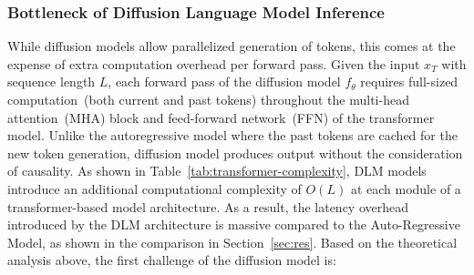 
\begin{table}[h!]
\centering
\renewcommand{\arraystretch}{1.1}
\vspace{1.0em}
\caption{Compute complexity of Transformer modules: AR decodes a prefix of length \(l\) per token vs. DLM processes full length \(L\) each denoising step.}
\label{tab:transformer-complexity}
\end{table}

\subsubsection{Bottleneck of Diffusion Language Model Inference}

While diffusion models allow parallelized generation of tokens, this comes at the expense of extra computation overhead per forward pass. 
Given the input $x_T$ with sequence length $L$, each forward pass of the diffusion model $f_\theta$ requires full-sized computation~(both current and past tokens) throughout the multi-head attention~(MHA) block and feed-forward network~(FFN) of the transformer model. 
Unlike the autoregressive model where the past tokens are cached for the new token generation, diffusion model produces output without the consideration of causality. 
As shown in Table~\ref{tab:transformer-complexity}, DLM models introduce an additional computational complexity of $O(L)$ at each module of a transformer-based model architecture. 
As a result, the latency overhead introduced by the DLM architecture is massive compared to the Auto-Regressive Model, as shown in the comparison in Section~\ref{sec:res}. 
Based on the theoretical analysis above, the first challenge of the diffusion model is: 


